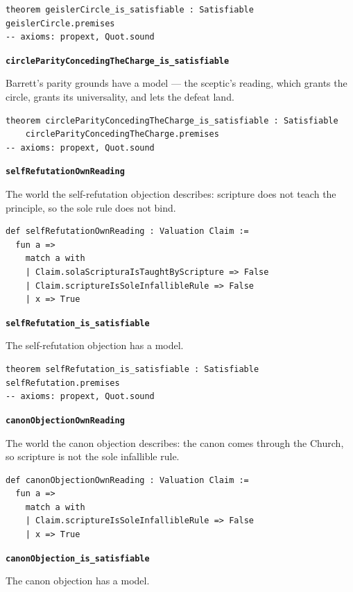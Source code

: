 \documentclass[11pt]{article}
\begin{document}
{\small\begin{verbatim}
theorem geislerCircle_is_satisfiable : Satisfiable geislerCircle.premises
-- axioms: propext, Quot.sound
\end{verbatim}}
\par\medskip\noindent\textbf{\texttt{circle\allowbreak{}Parity\allowbreak{}Conceding\allowbreak{}The\allowbreak{}Charge\_\allowbreak{}is\_\allowbreak{}satisfiable}}\par\nobreak\noindent
Barrett's parity grounds have a model — the sceptic's reading, which grants the circle, grants its universality, and lets the defeat land.

{\small\begin{verbatim}
theorem circleParityConcedingTheCharge_is_satisfiable : Satisfiable
    circleParityConcedingTheCharge.premises
-- axioms: propext, Quot.sound
\end{verbatim}}
\par\medskip\noindent\textbf{\texttt{self\allowbreak{}Refutation\allowbreak{}Own\allowbreak{}Reading}}\par\nobreak\noindent
The world the self-refutation objection describes: scripture does not teach the principle, so the sole rule does not bind.

{\small\begin{verbatim}
def selfRefutationOwnReading : Valuation Claim :=
  fun a =>
    match a with
    | Claim.solaScripturaIsTaughtByScripture => False
    | Claim.scriptureIsSoleInfallibleRule => False
    | x => True
\end{verbatim}}
\par\medskip\noindent\textbf{\texttt{self\allowbreak{}Refutation\_\allowbreak{}is\_\allowbreak{}satisfiable}}\par\nobreak\noindent
The self-refutation objection has a model.

{\small\begin{verbatim}
theorem selfRefutation_is_satisfiable : Satisfiable selfRefutation.premises
-- axioms: propext, Quot.sound
\end{verbatim}}
\par\medskip\noindent\textbf{\texttt{canon\allowbreak{}Objection\allowbreak{}Own\allowbreak{}Reading}}\par\nobreak\noindent
The world the canon objection describes: the canon comes through the Church, so scripture is not the sole infallible rule.

{\small\begin{verbatim}
def canonObjectionOwnReading : Valuation Claim :=
  fun a =>
    match a with
    | Claim.scriptureIsSoleInfallibleRule => False
    | x => True
\end{verbatim}}
\par\medskip\noindent\textbf{\texttt{canon\allowbreak{}Objection\_\allowbreak{}is\_\allowbreak{}satisfiable}}\par\nobreak\noindent
The canon objection has a model.
\end{document}
